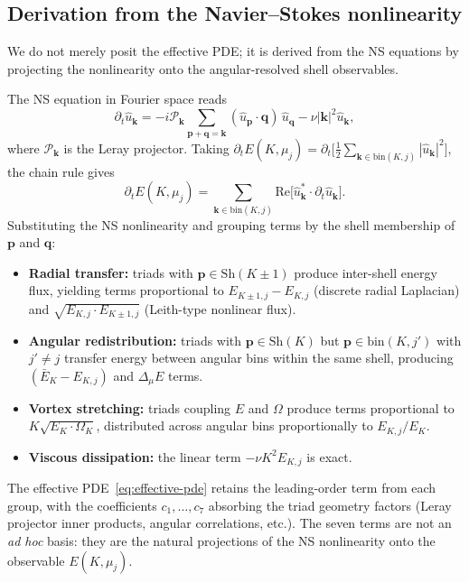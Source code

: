 \documentclass[11pt,a4paper]{article}
\theoremstyle{remark}
\begin{document}
\subsection{Derivation from the Navier--Stokes nonlinearity}\label{sec:derivation}

We do not merely posit the effective PDE; it is derived from the NS equations by projecting the nonlinearity onto the angular-resolved shell observables.

The NS equation in Fourier space reads
\[
  \partial_t \hat{u}_{\mathbf{k}} = -i \mathcal{P}_{\mathbf{k}} \sum_{\mathbf{p}+\mathbf{q}=\mathbf{k}} (\hat{u}_{\mathbf{p}} \cdot \mathbf{q})\, \hat{u}_{\mathbf{q}} - \nu |\mathbf{k}|^2 \hat{u}_{\mathbf{k}},
\]
where $\mathcal{P}_{\mathbf{k}}$ is the Leray projector.  Taking $\partial_t E(K, \mu_j) = \partial_t \bigl[\frac{1}{2} \sum_{\mathbf{k} \in \mathrm{bin}(K,j)} |\hat{u}_{\mathbf{k}}|^2\bigr]$, the chain rule gives
\[
  \partial_t E(K, \mu_j) = \sum_{\mathbf{k} \in \mathrm{bin}(K,j)} \mathrm{Re}\bigl[\hat{u}_{\mathbf{k}}^* \cdot \partial_t \hat{u}_{\mathbf{k}}\bigr].
\]
Substituting the NS nonlinearity and grouping terms by the shell membership of $\mathbf{p}$ and $\mathbf{q}$:

\begin{itemize}
\item \textbf{Radial transfer:} triads with $\mathbf{p} \in \mathrm{Sh}(K\pm 1)$ produce inter-shell energy flux, yielding terms proportional to $E_{K\pm 1,j} - E_{K,j}$ (discrete radial Laplacian) and $\sqrt{E_{K,j} \cdot E_{K\pm 1,j}}$ (Leith-type nonlinear flux).
\item \textbf{Angular redistribution:} triads with $\mathbf{p} \in \mathrm{Sh}(K)$ but $\mathbf{p} \in \mathrm{bin}(K, j')$ with $j' \neq j$ transfer energy between angular bins within the same shell, producing $(\bar{E}_K - E_{K,j})$ and $\Delta_\mu E$ terms.
\item \textbf{Vortex stretching:} triads coupling $E$ and $\Omega$ produce terms proportional to $K\sqrt{E_K \cdot \Omega_K}$, distributed across angular bins proportionally to $E_{K,j}/E_K$.
\item \textbf{Viscous dissipation:} the linear term $-\nu K^2 E_{K,j}$ is exact.
\end{itemize}

The effective PDE~\eqref{eq:effective-pde} retains the leading-order term from each group, with the coefficients $c_1, \ldots, c_7$ absorbing the triad geometry factors (Leray projector inner products, angular correlations, etc.).  The seven terms are not an \emph{ad hoc} basis: they are the natural projections of the NS nonlinearity onto the observable $E(K, \mu_j)$.
\end{document}
